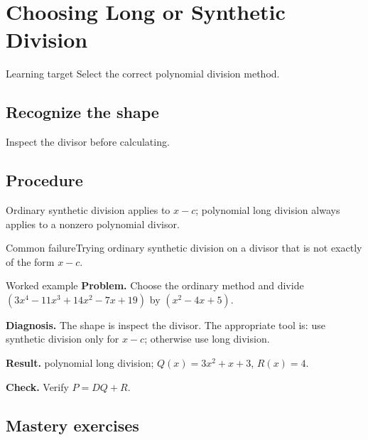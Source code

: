 \documentclass[11pt,oneside]{book}
\begin{document}
\chapter{Choosing Long or Synthetic Division}
\begin{rulebox}{Learning target}
Select the correct polynomial division method.
\end{rulebox}
\section{Recognize the shape}
Inspect the divisor before calculating.
\section{Procedure}
Ordinary synthetic division applies to $x-c$; polynomial long division always applies to a nonzero polynomial divisor.

\begin{warningbox}{Common failure}Trying ordinary synthetic division on a divisor that is not exactly of the form $x-c$.\end{warningbox}
\begin{examplebox}{Worked example}
\textbf{Problem.} Choose the ordinary method and divide $(3 x^{4} - 11 x^{3} + 14 x^{2} - 7 x + 19)$ by $(x^{2} - 4 x + 5)$.

\textbf{Diagnosis.} The shape is inspect the divisor. The appropriate tool is: use synthetic division only for $x-c$; otherwise use long division.

\textbf{Result.} polynomial long division; $Q(x)=3 x^{2} + x + 3$, $R(x)=4$.

\textbf{Check.} Verify $P=DQ+R$.
\end{examplebox}
\section{Mastery exercises}
\end{document}
